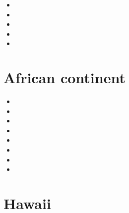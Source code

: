 \begin{scriptsize}
\begin{itemize}
\item[\twothousand]
\item[\twothousandfour]
\item[\twothousandfive]
\item[\twothousandsix]
\item[\twothousandnineteen]
\end{itemize}
\end{scriptsize}

\section{African continent}

\begin{scriptsize}
\begin{itemize}
\item[\nineteenninetyfour]
\item[\nineteenninetynine]
\item[\twothousandeleven]
\item[\twothousandtwelve]
\item[\twothousandfourteen]
\item[\twothousandseventeen]
\item[\twothousandeighteen]
\item[\twothousandtwenty]
\end{itemize}
\end{scriptsize}

\section{Hawaii}

